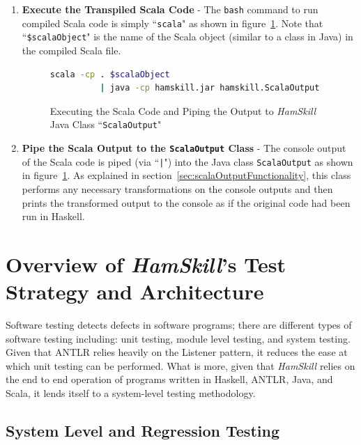 \documentclass{report}
\begin{document}
\begin{enumerate}
\item \textbf{Execute the Transpiled Scala Code} - The \texttt{bash} command to run compiled Scala code is simply ``\texttt{scala}" as shown in figure~\ref{fig:runScalaAndConvertOutput}.  Note that ``\texttt{\$scalaObject}" is the name of the Scala object (similar to a class in Java) in the compiled Scala file.

\begin{figure}[H]
\begin{mdframed}
\begin{lstlisting}[language=bash]
scala -cp . $scalaObject 
          | java -cp hamskill.jar hamskill.ScalaOutput
\end{lstlisting}
\end{mdframed}
\caption{Executing the Scala Code and Piping the Output to \textit{HamSkill} Java Class ``\texttt{ScalaOutput}"}\label{fig:runScalaAndConvertOutput}
\end{figure}

\item \textbf{Pipe the Scala Output to the \texttt{ScalaOutput} Class} - The console output of the Scala code is piped (via ``\texttt{|}") into the Java class \texttt{ScalaOutput} as shown in figure~\ref{fig:runScalaAndConvertOutput}.  As explained in section~\ref{sec:scalaOutputFunctionality}, this class performs any necessary transformations on the console outputs and then prints the transformed output to the console as if the original code had been run in Haskell.

\end{enumerate} 


\section{Overview of \textit{HamSkill}'s Test Strategy and Architecture}

Software testing detects defects in software programs; there are different types of software testing including: unit testing, module level testing, and system testing.  Given that ANTLR relies heavily on the Listener pattern, it reduces the ease at which unit testing can be performed.  What is more, given that \textit{HamSkill} relies on the end to end operation of programs written in Haskell, ANTLR, Java, and Scala, it lends itself to a system-level testing methodology.

\subsection{System Level and Regression Testing}
\end{document}
